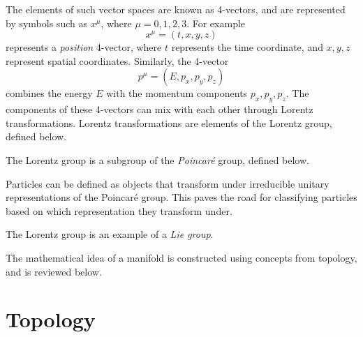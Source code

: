 The elements of such vector spaces are known as 4-vectors, and are represented by symbols such as $x^\mu$, where $\mu = 0,1,2,3$. For example $$x^\mu = (t, x, y, z)$$ represents a \emph{position} 4-vector, where $t$ represents the time coordinate, and $x,y,z$ represent spatial coordinates. Similarly, the 4-vector
$$p^\mu = (E, p_x, p_y, p_z)$$ combines the energy $E$ with the momentum components $p_x,p_y,p_z$. The components of these 4-vectors can mix with each other through Lorentz transformations. Lorentz transformations are elements of the Lorentz group, defined below.


The Lorentz group is a subgroup of the \emph{Poincar\'e} group, defined below.

Particles can be defined as objects that transform under irreducible unitary representations of the Poincar\'e group. This paves the road for classifying particles based on which representation they transform under.

The Lorentz group is an example of a \emph{Lie group}.


The mathematical idea of a manifold is constructed using concepts from topology, and is reviewed below.

\section{Topology}


